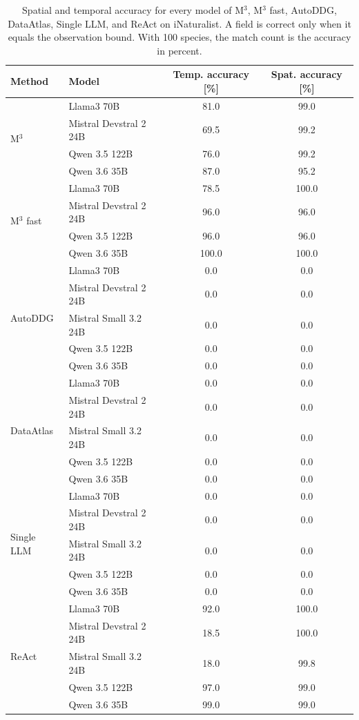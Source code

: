 \begin{table}
\caption{Spatial and temporal accuracy for every model of M$^3$, M$^3$ fast, AutoDDG, DataAtlas, Single LLM, and ReAct on iNaturalist. A field is correct only when it equals the observation bound. With 100 species, the match count is the accuracy in percent.}
\label{tab:all_models_inat_spat_temp}
\begin{tabular}{llcc}
\toprule
Method & Model & Temp. accuracy [\%] & Spat. accuracy [\%] \\
\midrule
\multirow[t]{4}{*}{M$^3$} & Llama3 70B & 81.0 & 99.0 \\
 & Mistral Devstral 2 24B & 69.5 & 99.2 \\
 & Qwen 3.5 122B & 76.0 & 99.2 \\
 & Qwen 3.6 35B & 87.0 & 95.2 \\
\midrule
\multirow[t]{4}{*}{M$^3$ fast} & Llama3 70B & 78.5 & 100.0 \\
 & Mistral Devstral 2 24B & 96.0 & 96.0 \\
 & Qwen 3.5 122B & 96.0 & 96.0 \\
 & Qwen 3.6 35B & 100.0 & 100.0 \\
\midrule
\multirow[t]{5}{*}{AutoDDG} & Llama3 70B & 0.0 & 0.0 \\
 & Mistral Devstral 2 24B & 0.0 & 0.0 \\
 & Mistral Small 3.2 24B & 0.0 & 0.0 \\
 & Qwen 3.5 122B & 0.0 & 0.0 \\
 & Qwen 3.6 35B & 0.0 & 0.0 \\
\midrule
\multirow[t]{5}{*}{DataAtlas} & Llama3 70B & 0.0 & 0.0 \\
 & Mistral Devstral 2 24B & 0.0 & 0.0 \\
 & Mistral Small 3.2 24B & 0.0 & 0.0 \\
 & Qwen 3.5 122B & 0.0 & 0.0 \\
 & Qwen 3.6 35B & 0.0 & 0.0 \\
\midrule
\multirow[t]{5}{*}{Single LLM} & Llama3 70B & 0.0 & 0.0 \\
 & Mistral Devstral 2 24B & 0.0 & 0.0 \\
 & Mistral Small 3.2 24B & 0.0 & 0.0 \\
 & Qwen 3.5 122B & 0.0 & 0.0 \\
 & Qwen 3.6 35B & 0.0 & 0.0 \\
\midrule
\multirow[t]{5}{*}{ReAct} & Llama3 70B & 92.0 & 100.0 \\
 & Mistral Devstral 2 24B & 18.5 & 100.0 \\
 & Mistral Small 3.2 24B & 18.0 & 99.8 \\
 & Qwen 3.5 122B & 97.0 & 99.0 \\
 & Qwen 3.6 35B & 99.0 & 99.0 \\
\bottomrule
\end{tabular}
\end{table}
